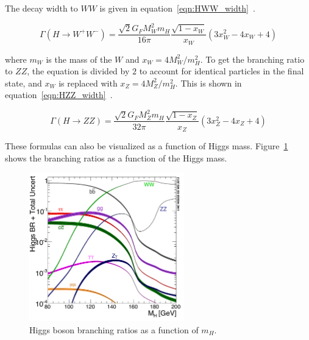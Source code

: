 The decay width to $WW$ is given in equation~\ref{eqn:HWW_width}~\cite{Tully}. 

\begin{equation}
\label{eqn:HWW_width}
\Gamma(H\to W^+W^-) = \frac{\sqrt{2} G_F M_W^2 m_H}{16\pi}\frac{\sqrt{1-x_W}}{x_W}\left(3x_W^2 - 4x_W + 4\right)
\end{equation}

where $m_W$ is the mass of the $W$ and $x_W  = 4M_W^2/m_H^2$. To get the branching ratio to $ZZ$, the equation is divided by $2$ to account for identical particles in the final state, and $x_W$ is replaced with $x_Z = 4M_Z^2/m_H^2$. This is shown in equation~\ref{eqn:HZZ_width}~\cite{Tully}.

\begin{equation}
\label{eqn:HZZ_width}
\Gamma(H\to ZZ) = \frac{\sqrt{2} G_F M_Z^2 m_H}{32\pi}\frac{\sqrt{1-x_Z}}{x_Z}\left(3x_Z^2 - 4x_Z + 4\right)
\end{equation}

These formulas can also be visualized as a function of Higgs mass. Figure~\ref{fig:branching_ratios} shows the branching ratios as a function of the Higgs mass. 

\begin{figure}[h!]
  \centering
  \captionsetup{justification=centering}
  \includegraphics[width=0.6\textwidth]{figures/Higgs_BR}
  \caption{Higgs boson branching ratios as a function of $m_H$\cite{LHCXSWG}.}
  \label{fig:branching_ratios}
\end{figure}

